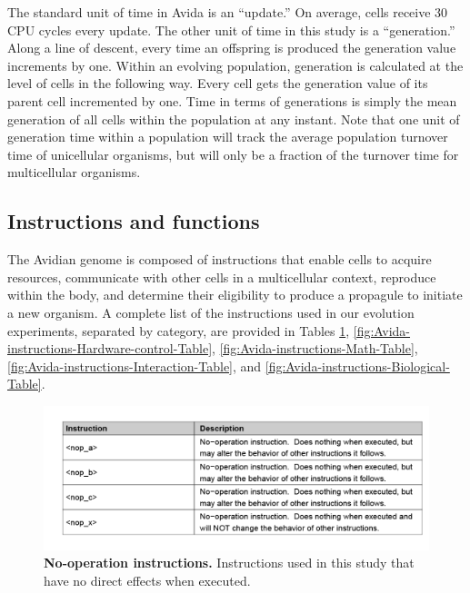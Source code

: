 \documentclass[
]{book}
\begin{document}
The standard unit of time in Avida is an ``update.'' On average, cells receive 30 CPU cycles every update. The other unit of time in this study is a ``generation.'' Along a line of descent, every time an offspring is produced the generation value increments by one. Within an evolving population, generation is calculated at the level of cells in the following way. Every cell gets the generation value of its parent cell incremented by one. Time in terms of generations is simply the mean generation of all cells within the population at any instant. Note that one unit of generation time within a population will track the average population turnover time of unicellular organisms, but will only be a fraction of the turnover time for multicellular organisms.

\hypertarget{instructions-and-functions}{%
\subsection{Instructions and functions}\label{instructions-and-functions}}

The Avidian genome is composed of instructions that enable cells to acquire resources, communicate with other cells in a multicellular context, reproduce within the body, and determine their eligibility to produce a propagule to initiate a new organism. A complete list of the instructions used in our evolution experiments, separated by category, are provided in Tables \ref{fig:Avida-instructions-No-operation-Table}, \ref{fig:Avida-instructions-Hardware-control-Table},
\ref{fig:Avida-instructions-Math-Table},
\ref{fig:Avida-instructions-Interaction-Table}, and
\ref{fig:Avida-instructions-Biological-Table}.

\begin{figure}
\centering
\includegraphics{images/Avida_instructions_No-operation_Table.png}
\caption{\label{fig:Avida-instructions-No-operation-Table}\textbf{No-operation instructions.} Instructions used in this study that have no direct effects when executed.}
\end{figure}
\end{document}
